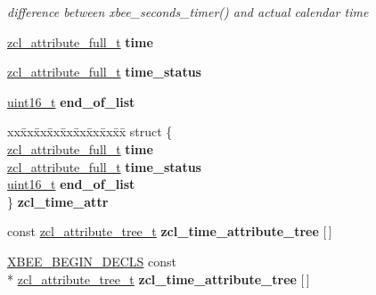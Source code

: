 \begin{DoxyCompactItemize}
\begin{DoxyCompactList}\small\item\em difference between xbee\-\_\-seconds\-\_\-timer() and actual calendar time \end{DoxyCompactList}\item 
\hyperlink{structzcl__attribute__full__t}{zcl\-\_\-attribute\-\_\-full\-\_\-t} {\bfseries time}
\item 
\hyperlink{structzcl__attribute__full__t}{zcl\-\_\-attribute\-\_\-full\-\_\-t} {\bfseries time\-\_\-status}
\item 
\hyperlink{group__hal_ga5a8b2dc9e45a9ee81a94ef304fb62505}{uint16\-\_\-t} {\bfseries end\-\_\-of\-\_\-list}
\item 
\begin{tabbing}
xx\=xx\=xx\=xx\=xx\=xx\=xx\=xx\=xx\=\kill
struct \{\\
\>\hyperlink{structzcl__attribute__full__t}{zcl\_attribute\_full\_t} {\bfseries time}\\
\>\hyperlink{structzcl__attribute__full__t}{zcl\_attribute\_full\_t} {\bfseries time\_status}\\
\>\hyperlink{group__hal_ga5a8b2dc9e45a9ee81a94ef304fb62505}{uint16\_t} {\bfseries end\_of\_list}\\
\} {\bfseries zcl\_time\_attr}\\

\end{tabbing}\item 
const \hyperlink{structzcl__attribute__tree__t}{zcl\-\_\-attribute\-\_\-tree\-\_\-t} {\bfseries zcl\-\_\-time\-\_\-attribute\-\_\-tree} \mbox{[}$\,$\mbox{]}
\item 
\hypertarget{group__zcl__time_ga926f1bfd80ed5a894abfc872a292c556}{\hyperlink{group__hal_ga336bff4f4a6012aacc4468132bbd3d7f}{X\-B\-E\-E\-\_\-\-B\-E\-G\-I\-N\-\_\-\-D\-E\-C\-L\-S} const \\*
\hyperlink{structzcl__attribute__tree__t}{zcl\-\_\-attribute\-\_\-tree\-\_\-t} {\bfseries zcl\-\_\-time\-\_\-attribute\-\_\-tree} \mbox{[}$\,$\mbox{]}}\label{group__zcl__time_ga926f1bfd80ed5a894abfc872a292c556}

\end{DoxyCompactItemize}
\label{_amgrp01747264fe7bf50731df0522c351974e}%
